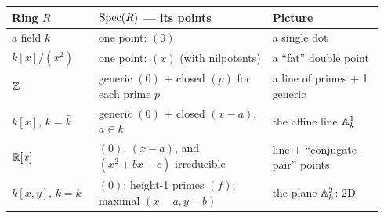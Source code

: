 \begin{center}
\renewcommand{\arraystretch}{1.35}
\begin{tabular}{@{}L{0.22\linewidth} L{0.44\linewidth} L{0.28\linewidth}@{}}
\toprule
\textbf{Ring $R$} & \textbf{$\Spec(R)$ --- its points} & \textbf{Picture} \\
\midrule
a field $k$ & one point: $(0)$ & a single dot \\
$k[x]/(x^2)$ & one point: $(x)$ (with nilpotents) & a ``fat'' double point \\
$\ZZ$ & generic $(0)$ + closed $(p)$ for each prime $p$ & a line of primes + 1 generic \\
$k[x]$, $k=\bar k$ & generic $(0)$ + closed $(x-a)$, $a\in k$ & the affine line $\AA^1_k$ \\
$\RR[x]$ & $(0)$, $(x-a)$, and $(x^2+bx+c)$ irreducible & line + ``conjugate-pair'' points \\
$k[x,y]$, $k=\bar k$ & $(0)$; height-1 primes $(f)$; maximal $(x-a,y-b)$ & the plane $\AA^2_k$: 2D \\
\bottomrule
\end{tabular}
\end{center}

